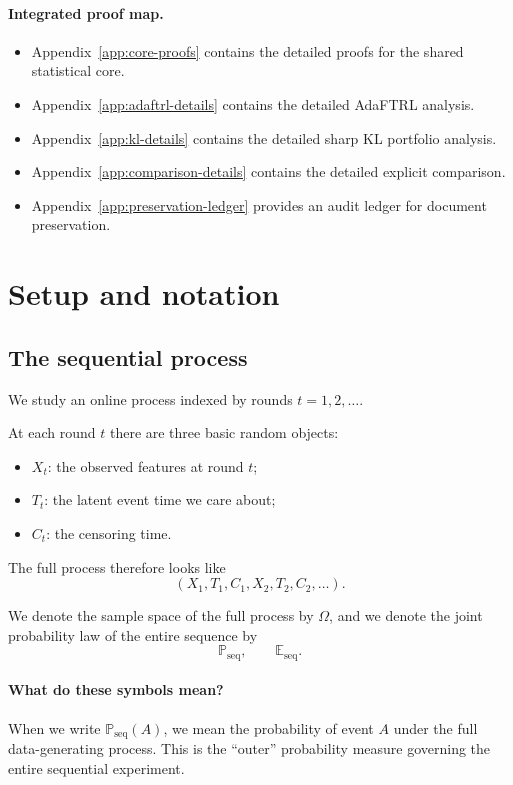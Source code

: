 \documentclass[11pt]{article}
\newcommand{\E}{\mathbb{E}}
\newcommand{\Prob}{\mathbb{P}}
\newcommand{\1}{\mathbf{1}}
\newcommand{\seq}{\mathrm{seq}}
\begin{document}
\paragraph{Integrated proof map.}
\begin{itemize}[leftmargin=*,itemsep=2pt]
  \item Appendix~\ref{app:core-proofs} contains the detailed proofs for the shared statistical core.
  \item Appendix~\ref{app:adaftrl-details} contains the detailed AdaFTRL analysis.
  \item Appendix~\ref{app:kl-details} contains the detailed sharp KL portfolio analysis.
  \item Appendix~\ref{app:comparison-details} contains the detailed explicit comparison.
  \item Appendix~\ref{app:preservation-ledger} provides an audit ledger for document preservation.
\end{itemize}

\section{Setup and notation}
\label{sec:setup}

\subsection{The sequential process}

We study an online process indexed by rounds $t=1,2,\dots$.

At each round $t$ there are three basic random objects:
\begin{itemize}[leftmargin=*,itemsep=2pt]
  \item $X_t$: the observed features at round $t$;
  \item $T_t$: the latent event time we care about;
  \item $C_t$: the censoring time.
\end{itemize}

The full process therefore looks like
\[
(X_1,T_1,C_1,X_2,T_2,C_2,\dots).
\]

We denote the sample space of the full process by $\Omega$, and we denote the joint probability law of the entire sequence by
\[
\Prob_{\seq},\qquad \E_{\seq}.
\]

\paragraph{What do these symbols mean?}
When we write $\Prob_{\seq}(A)$, we mean the probability of event $A$ under the full data-generating process. This is the ``outer'' probability measure governing the entire sequential experiment.
\end{document}
